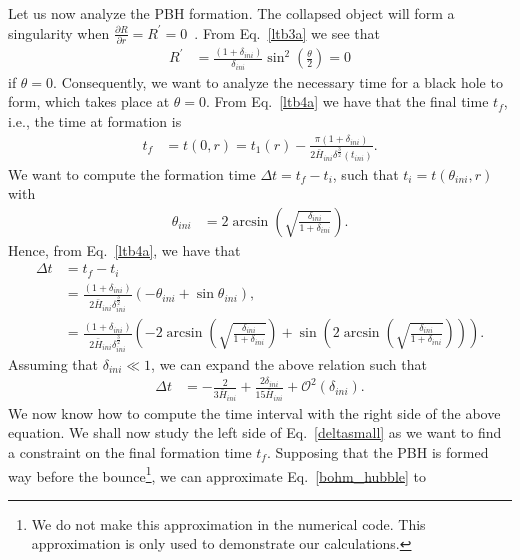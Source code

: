 \documentclass[a4paper,11pt]{article}
\begin{document}
Let us now analyze the PBH formation. The collapsed object will form a singularity when $\frac{\partial R}{\partial r} = {R}^\prime = 0$~\cite{Dey2023}. From Eq.~\eqref{ltb3a} we see that
\begin{align}
	{R}^\prime & = \frac{ (1+\delta_{ini})}{\delta_{ini}}\sin^2\left(\frac{\theta}{2}\right) = 0
\end{align}
if $\theta = 0$. Consequently, we want to analyze the necessary time for a black hole to form, which takes place at $\theta = 0$. From Eq.~\eqref{ltb4a} we have that the final time $t_f$, i.e., the time at formation is
\begin{align}
	t_f & = t(0,r ) =t_1(r) - \frac{\pi(1 + \delta_{ini})}{2\bar{H}_{ini}\delta^{\frac{3}{2}}(t_{ini})}
	.\end{align}
We want to compute the formation time $\Delta t = t_f - t_i$, such that $t_i = t(\theta_{ini}, r)$ with
\begin{align}
	\theta_{ini} & = 2\arcsin(\sqrt{\frac{\delta_{ini}}{1+\delta_{ini}}})
	.\end{align}
Hence, from Eq.~\eqref{ltb4a}, we have that
\begin{align}
	\label{criticallinear}
	\Delta t & = t_f - t_i \nonumber                                                                                                                                                                                 \\
	         & =\frac{(1 + \delta_{ini})}{2\bar{H}_{ini}\delta^{\frac{3}{2}}_{ini} } \left(  -\theta_{ini} +\sin{\theta_{ini}}\right) ,\nonumber                                                                     \\
	         & =\frac{(1 + \delta_{ini})}{2\bar{H}_{ini}\delta^{\frac{3}{2}}_{ini} } \left( -2\arcsin(\sqrt{\frac{\delta_{ini}}{1+\delta_{ini}}}) +\sin(2\arcsin(\sqrt{\frac{\delta_{ini}}{1+\delta_{ini}}}))\right)
	.\end{align}
Assuming that $\delta_{ini} \ll 1$, we can expand the above relation such that
\begin{align}
	\label{deltasmall}
	\Delta t & = -\frac{2}{3\bar{H}_{ini}}+\frac{2\delta_{ini}}{15\bar{H}_{ini}} + \mathcal{O}^2(\delta_{ini})
	.\end{align}
We now know how to compute the time interval with the right side of the above equation. We shall now study the left side of Eq.~\eqref{deltasmall} as we want to find a constraint on the final formation time $t_f$. Supposing that the PBH is formed way before the bounce\footnote{We do not make this approximation in the numerical code. This approximation is only used to demonstrate our calculations.}, we can approximate Eq.~\eqref{bohm_hubble} to
\end{document}
